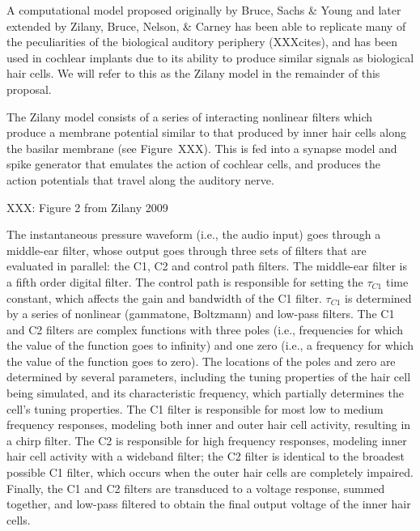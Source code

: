 \documentclass{article}
\begin{document}
A computational model proposed originally by
Bruce, Sachs \& Young
and later extended by Zilany, Bruce, Nelson, \& Carney
has been able to replicate
many of the peculiarities
of the biological auditory periphery (XXXcites),
and has been used in cochlear implants
due to its ability to produce
similar signals as biological hair cells.
We will refer to this as the
Zilany model in the remainder of this proposal.

The Zilany model consists of a series
of interacting nonlinear filters
which produce a membrane potential
similar to that produced
by inner hair cells along the basilar membrane
(see Figure~XXX).
This is fed into a synapse model and spike generator
that emulates the action of cochlear cells,
and produces the action potentials
that travel along the auditory nerve.

XXX: Figure 2 from Zilany 2009

The instantaneous pressure waveform
(i.e., the audio input)
goes through a middle-ear filter,
whose output goes through three sets of filters
that are evaluated in parallel:
the C1, C2 and control path filters.
The middle-ear filter is a fifth order digital filter.
The control path is responsible for
setting the $\tau_{C1}$ time constant,
which affects the gain and bandwidth
of the C1 filter.
$\tau_{C1}$ is determined by
a series of nonlinear
(gammatone, Boltzmann)
and low-pass filters.
The C1 and C2 filters are
complex functions with three poles
(i.e., frequencies for which the
value of the function goes to infinity)
and one zero (i.e., a frequency
for which the value of the function goes to zero).
The locations of the poles and zero
are determined by
several parameters, including
the tuning properties of
the hair cell being simulated,
and its characteristic frequency,
which partially determines the cell's
tuning properties.
The C1 filter is responsible for most
low to medium frequency responses,
modeling both inner and outer hair cell
activity, resulting in a chirp filter.
The C2 is responsible for high frequency responses,
modeling inner hair cell activity
with a wideband filter;
the C2 filter is identical
to the broadest possible C1 filter,
which occurs when the outer hair cells
are completely impaired.
Finally, the C1 and C2 filters
are transduced to a voltage response,
summed together, and low-pass filtered
to obtain the final output voltage
of the inner hair cells.
\end{document}
